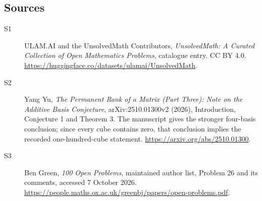 \documentclass[11pt]{article}
\begin{document}
\subsection{Sources}
\begin{description}
\item[\hypertarget{source:statement:1}{S1}] ULAM.AI and the UnsolvedMath Contributors, \emph{UnsolvedMath: A Curated Collection of Open Mathematics Problems}, catalogue entry. CC BY 4.0. \url{https://huggingface.co/datasets/ulamai/UnsolvedMath}.
\item[\hypertarget{source:statement:2}{S2}] Yang Yu, \emph{The Permanent Rank of a Matrix (Part Three): Note on the Additive Basis Conjecture}, arXiv:2510.01300v2 (2026), Introduction, Conjecture 1 and Theorem 3. The manuscript gives the stronger four-basis conclusion; since every cube contains zero, that conclusion implies the recorded one-hundred-cube statement. \url{https://arxiv.org/abs/2510.01300}.
\item[\hypertarget{source:statement:3}{S3}] Ben Green, \emph{100 Open Problems}, maintained author list, Problem 26 and its comments, accessed 7 October 2026. \url{https://people.maths.ox.ac.uk/greenbj/papers/open-problems.pdf}.
\end{description}
\label{end:statement}
\end{document}
